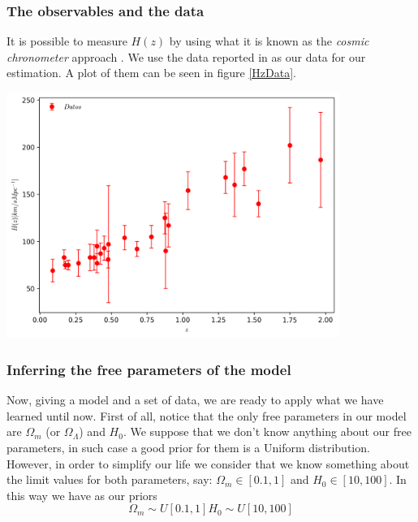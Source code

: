 \documentclass[onecolumn,           %
               showpacs,            %
               preprintnumbers,     %
               aps,                 %
               prl,          	    %
               letterpaper,             %
               superscriptaddress,      %
               nofootinbib,         %
               tightenlines,        %
               floats,floatfix      %
               ,usenatbib,
               ]{revtex4-1}
\begin{document}
\subsubsection{The observables and the data}

It is possible to measure $H(z)$ by using what it is known as the \textit{cosmic chronometer} approach \cite{Hz}. We use the data reported in \cite{Hzdata} as our data for our estimation. A plot of them can be seen in figure \ref{HzData}.

\begin{minipage}{\textwidth}
\centering
\includegraphics[height=8cm]{Figures/Hzdata.png}
\label{HzData}
\end{minipage}

\subsubsection{Inferring the free parameters of the model}

Now, giving a model and a set of data, we are ready to apply what we have learned until now. First of all, notice that the only free parameters in our model are $\Omega_m$ (or $\Omega_\Lambda$) and $H_0$. We suppose that we don't know anything about our free parameters, in such case a good prior for them is a Uniform distribution. However, in order to simplify our life we consider that we know something about the limit values for both parameters,  say: $\Omega_m\in [0.1,1]$ and $H_0\in [10,100]$. In this way we have as our priors
\begin{subequations}
\begin{equation}
\Omega_m\sim U[0.1,1]
\end{equation}
\begin{equation}
H_0\sim U[10,100]
\end{equation}
\end{subequations} 
\end{document}
